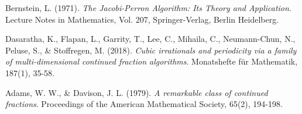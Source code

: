 \begin{thebibliography}{99}
Bernstein, L. (1971).
\textit{The Jacobi-Perron Algorithm: Its Theory and Application}.
Lecture Notes in Mathematics, Vol. 207, Springer-Verlag, Berlin Heidelberg.

Dasaratha, K., Flapan, L., Garrity, T., Lee, C., Mihaila, C., Neumann-Chun, N., Peluse, S., & Stoffregen, M. (2018).
\textit{Cubic irrationals and periodicity via a family of multi-dimensional continued fraction algorithms}.
Monatshefte für Mathematik, 187(1), 35-58.

Adams, W. W., & Davison, J. L. (1979).
\textit{A remarkable class of continued fractions}.
Proceedings of the American Mathematical Society, 65(2), 194-198.

\end{thebibliography} 
